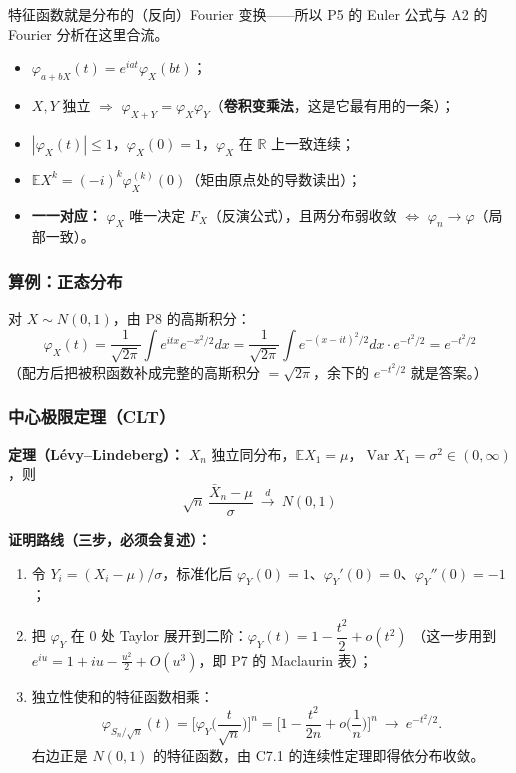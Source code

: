 特征函数就是分布的（反向）Fourier 变换——所以 P5 的 Euler 公式与 A2 的 Fourier 分析在这里合流。

\begin{itemize}
  \item $\varphi_{a+bX}(t)=e^{iat}\varphi_X(bt)$；
  \item $X,Y$ 独立 $\Longrightarrow$ $\varphi_{X+Y}=\varphi_X\varphi_Y$（\textbf{卷积变乘法}，这是它最有用的一条）；
  \item $|\varphi_X(t)|\le1$，$\varphi_X(0)=1$，$\varphi_X$ 在 $\mathbb R$ 上一致连续；
  \item $\mathbb E X^k=(-i)^k\varphi_X^{(k)}(0)$（矩由原点处的导数读出）；
  \item \textbf{一一对应：} $\varphi_X$ 唯一决定 $F_X$（反演公式），且两分布弱收敛 $\iff$ $\varphi_n\to\varphi$（局部一致）。
\end{itemize}

\subsubsection{算例：正态分布}

对 $X\sim N(0,1)$，由 P8 的高斯积分：
\[
\varphi_X(t)=\frac{1}{\sqrt{2\pi}}\int e^{itx}e^{-x^2/2}dx
=\frac{1}{\sqrt{2\pi}}\int e^{-(x-it)^2/2}dx\cdot e^{-t^2/2}=e^{-t^2/2}
\]
（配方后把被积函数补成完整的高斯积分 $=\sqrt{2\pi}$，余下的 $e^{-t^2/2}$ 就是答案。）

\subsubsection{中心极限定理（CLT）}

\textbf{定理（Lévy--Lindeberg）：} $X_n$ 独立同分布，$\mathbb E X_1=\mu$，$\operatorname{Var}X_1=\sigma^2\in(0,\infty)$，则
\[
\sqrt n\,\frac{\bar X_n-\mu}{\sigma}\ \xrightarrow{\ d\ }\ N(0,1)
\]

\textbf{证明路线（三步，必须会复述）：}
\begin{enumerate}
  \item 令 $Y_i=(X_i-\mu)/\sigma$，标准化后 $\varphi_Y(0)=1$、$\varphi_Y'(0)=0$、$\varphi_Y''(0)=-1$；
  \item 把 $\varphi_Y$ 在 $0$ 处 Taylor 展开到二阶：$\varphi_Y(t)=1-\dfrac{t^2}{2}+o(t^2)$
        （这一步用到 $e^{iu}=1+iu-\frac{u^2}{2}+O(u^3)$，即 P7 的 Maclaurin 表）；
  \item 独立性使和的特征函数相乘：
        \[
        \varphi_{S_n/\sqrt n}(t)=\Big[\varphi_Y\Big(\frac{t}{\sqrt n}\Big)\Big]^n
        =\Big[1-\frac{t^2}{2n}+o\Big(\frac1n\Big)\Big]^n\ \longrightarrow\ e^{-t^2/2}.
        \]
        右边正是 $N(0,1)$ 的特征函数，由 C7.1 的连续性定理即得依分布收敛。
\end{enumerate}

